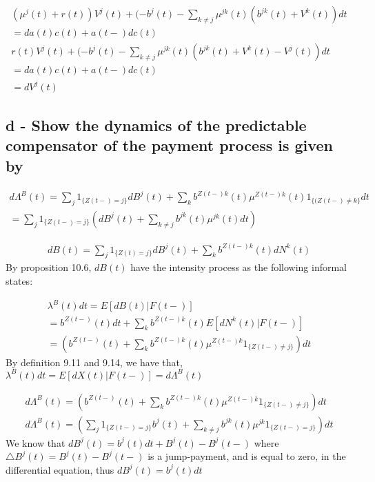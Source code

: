 \documentclass[12pt]{article}
\begin{document}
\begin{equation}
\begin{split}
(\mu^j(t) + r(t)) V^j(t) + 
(-b^j(t) - \sum_{k\neq j} \mu^{jk}(t) (b^{jk}(t)+V^k(t))dt 
\\ = da(t)c(t) + a(t-)dc(t) \\
r(t) V^j(t) + 
(-b^j(t) - \sum_{k\neq j} \mu^{jk}(t) (b^{jk}(t)+V^k(t)-V^j(t))dt 
\\ = da(t)c(t) + a(t-)dc(t)
\\ = dV^j(t)
\end{split}
\end{equation}   

\newpage

\subsection{d - Show the dynamics of the predictable compensator of the payment process is given by}

\begin{equation}
\begin{split}
d\Lambda^{B}(t) = \sum_j1_{\{Z(t-)=j\}}dB^j(t) + \sum_kb^{Z(t-)k}(t)\mu^{Z(t-)k}(t)1_{\{(Z(t-)\neq k\}}dt \\
= \sum_j1_{\{Z(t-)=j\}}(dB^j(t) + \sum_{k\neq j}b^{jk}(t)\mu^{jk}(t)dt)
\end{split}
\end{equation}

\begin{equation}
\begin{split}
dB(t) = \sum_j1_{\{Z(t)=j\}}dB^j(t) + \sum_kb^{Z(t-)k}(t)dN^{k}(t)
\end{split}
\end{equation}
By proposition 10.6, $dB(t)$ have the intensity process as the following informal states:

\begin{equation}
\begin{split}
\lambda^B (t) dt = E[dB(t)|F(t-)] \\
= b^{Z(t-)}(t)dt + \sum_kb^{Z(t-)k}(t)E[dN^{k}(t)|F(t-)] \\
= (b^{Z(t-)}(t) + \sum_kb^{Z(t-)k}(t)\mu^{Z(t-)k}1_{\{Z(t-)\neq j\}})dt
\end{split}
\end{equation}
By definition 9.11 and 9.14, we have that,$\lambda^B(t)dt=E[dX(t)|F(t-)]=d\Lambda^B(t)$

\begin{equation}
\begin{split}
d\Lambda^B(t) = (b^{Z(t-)}(t) + \sum_kb^{Z(t-)k}(t)\mu^{Z(t-)k}1_{\{Z(t-)\neq j\}})dt \\
d\Lambda^B(t) = (\sum_j1_{\{Z(t-)=j\}}b^j(t) + \sum_{k\neq j}b^{jk}(t)\mu^{jk}1_{\{Z(t-)= j\}})dt
\end{split}
\end{equation}
We know that $dB^j(t) = b^j(t)dt + B^j(t) - B^j(t-)$ where $\triangle B^j(t) = B^j(t) - B^j(t-)$ is a jump-payment, and is equal to zero, in the differential equation, thus $dB^j(t) = b^j(t)dt$
\end{document}
